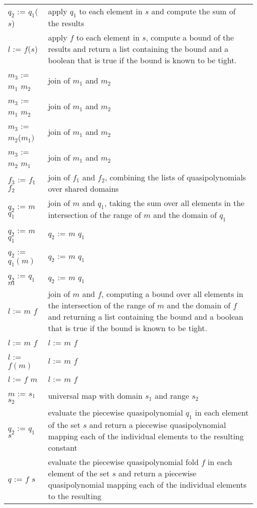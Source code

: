 \begin{supertabular}{p{0.35\textwidth}p{0.6\textwidth}}
$q_2$ := $q_1$($s$) & apply $q_1$ to each element in $s$ and compute
the sum of the results
\\
$l$ := $f$($s$) & apply $f$ to each element in $s$, compute
a bound of the results
and return a list containing the bound
and a boolean that is true if the bound
is known to be tight.
\\
$m_3$ := $m_1$  $m_2$ & join of $m_1$ and $m_2$
\\
$m_3$ := $m_1$  $m_2$ & join of $m_1$ and $m_2$
\\
$m_3$ := $m_2$($m_1)$ & join of $m_1$ and $m_2$
\\
$m_3$ := $m_2$  $m_1$ & join of $m_1$ and $m_2$
\\
$f_3$ := $f_1$  $f_2$ & join of $f_1$ and $f_2$, combining
the lists of quasipolynomials over shared domains
\\
$q_2$ := $m$  $q_1$ & join of $m$ and $q_1$, taking the sum
over all elements in the intersection of the range of $m$ and the domain
of $q_1$
\\
$q_2$ := $m$  $q_1$ & $q_2$ := $m$  $q_1$
\\
$q_2$ := $q_1(m)$ & $q_2$ := $m$  $q_1$
\\
$q_2$ := $q_1$  $m$ & $q_2$ := $m$  $q_1$
\\
$l$ := $m$  $f$ & join of $m$ and $f$, computing a bound
over all elements in the intersection of the range of $m$ and the domain
of $f$ and returning a list containing the bound
and a boolean that is true if the bound is known to be tight.
\\
$l$ := $m$  $f$ & $l$ := $m$  $f$
\\
$l$ := $f(m)$ & $l$ := $m$  $f$
\\
$l$ := $f$  $m$ & $l$ := $m$  $f$
\\
$m$ := $s_1$ \ai[\tt]{->} $s_2$ & universal map with domain $s_1$
and range $s_2$
\\
$q_2$ := $q_1$  $s$ &
evaluate the piecewise quasipolynomial $q_1$ in each element
of the set $s$ and return a piecewise quasipolynomial
mapping each of the individual elements to the resulting
constant
\\
$q$ := $f$  $s$ &
evaluate the piecewise quasipolynomial fold $f$ in each element
of the set $s$ and return a piecewise quasipolynomial
mapping each of the individual elements to the resulting

\end{supertabular}
